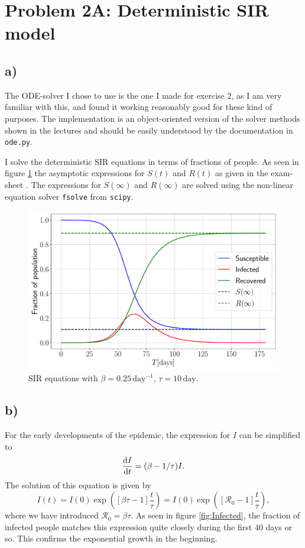 \section{Problem 2A: Deterministic SIR model}

\subsection{a)}

The ODE-solver I chose to use is the one I made for exercise $2$, as I am very familiar with this, and found it working reasonably good for these kind of purposes. The implementation is an object-oriented version of the solver methods shown in the lectures and should be easily understood by the documentation in \lstinline|ode.py|.

I solve the deterministic SIR equations in terms of fractions of people. As seen in figure \ref{fig:SIR} the asymptotic expressions for $S(t)$ and $R(t)$ as given in the exam-sheet \cite{sheet}. The expressions for $S(\infty)$ and $R(\infty)$ are solved using the non-linear equation solver \lstinline|fsolve| from \lstinline|scipy|.

\begin{figure}[htb]
	\centering
	\includegraphics[width=0.8\columnwidth]{../fig/2Aa_SIR.pdf}
	\caption{SIR equations with $\beta = 0.25 \, \mathrm{day}^{-1}$, $\tau = 10 \, \mathrm{day}$.}
	\label{fig:SIR}
\end{figure}

\subsection{b)}

For the early developments of the epidemic, the expression for $I$ can be simplified to \cite{sheet}
\begin{equation}\label{eq:I_simp}
	\frac{\text{d} I}{\text{d} t} = (\beta - 1/\tau) I.
\end{equation}
The solution of this equation is given by
$$
	I(t) = I(0) \exp{\left(\left[ \beta \tau - 1 \right] \frac{t}{\tau}\right)} = I(0) \exp{\left(\left[ \mathcal{R}_0 - 1 \right] \frac{t}{\tau} \right)},
$$
where we have introduced $\mathcal{R}_0 = \beta\tau$. As seen in figure \ref{fig:Infected}, the fraction of infected people matches this expression quite closely during the first $40$ days or so. This confirms the exponential growth in the beginning. 

